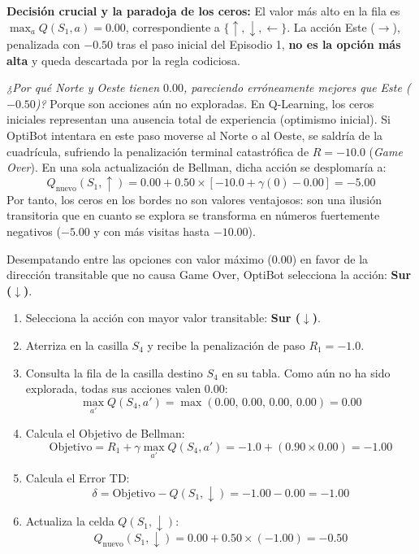 \begin{calculomanual}
\textbf{Decisión crucial y la paradoja de los ceros:} 
El valor más alto en la fila es $\max_a Q(S_1, a) = \mathbf{0.00}$, correspondiente a $\{\uparrow, \downarrow, \leftarrow\}$. La acción Este ($\rightarrow$), penalizada con $-0.50$ tras el paso inicial del Episodio 1, \textbf{no es la opción más alta} y queda descartada por la regla codiciosa.

\textit{¿Por qué Norte y Oeste tienen $0.00$, pareciendo erróneamente mejores que Este ($-0.50$)?}
Porque son acciones aún no exploradas. En Q-Learning, los ceros iniciales representan una ausencia total de experiencia (optimismo inicial). Si OptiBot intentara en este paso moverse al Norte o al Oeste, se saldría de la cuadrícula, sufriendo la penalización terminal catastrófica de $R = -10.0$ (\textit{Game Over}). En una sola actualización de Bellman, dicha acción se desplomaría a:
\[
  Q_{\text{nuevo}}(S_1, \uparrow) = 0.00 + 0.50 \times [-10.0 + \gamma(0) - 0.00] = \mathbf{-5.00}
\]
Por tanto, los ceros en los bordes no son valores ventajosos: son una ilusión transitoria que en cuanto se explora se transforma en números fuertemente negativos ($-5.00$ y con más visitas hasta $-10.00$).

Desempatando entre las opciones con valor máximo ($0.00$) en favor de la dirección transitable que no causa Game Over, OptiBot selecciona la acción: \textbf{Sur ($\downarrow$)}.
\begin{enumerate}
  \item Selecciona la acción con mayor valor transitable: \textbf{Sur ($\downarrow$)}.
  \item Aterriza en la casilla $S_4$ y recibe la penalización de paso $R_1 = -1.0$.
  \item Consulta la fila de la casilla destino $S_4$ en su tabla. Como aún no ha sido explorada, todas sus acciones valen $0.00$:
  \[
    \max_{a'} Q(S_4, a') = \max(0.00, \, 0.00, \, 0.00, \, 0.00) = \mathbf{0.00}
  \]
  \item Calcula el Objetivo de Bellman:
  \[
    \text{Objetivo} = R_1 + \gamma \max_{a'} Q(S_4, a') = -1.0 + (0.90 \times 0.00) = \mathbf{-1.00}
  \]
  \item Calcula el Error TD:
  \[
    \delta = \text{Objetivo} - Q(S_1, \downarrow) = -1.00 - 0.00 = \mathbf{-1.00}
  \]
  \item Actualiza la celda $Q(S_1, \downarrow)$:
  \[
    Q_{\text{nuevo}}(S_1, \downarrow) = 0.00 + 0.50 \times (-1.00) = \mathbf{-0.50}
  \]
\end{enumerate}


\end{calculomanual}
